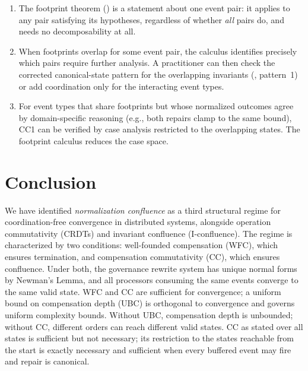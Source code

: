 \documentclass[11pt,a4paper]{article}
\theoremstyle{plain}
\theoremstyle{definition}
\theoremstyle{remark}
\renewcommand{\_}{\textunderscore\allowbreak}
\begin{document}
\begin{enumerate}[leftmargin=*,nosep]
\item The footprint theorem () is a statement about
  one event pair: it applies to any pair satisfying its hypotheses,
  regardless of whether \emph{all} pairs do, and 
  needs no decomposability at all.
\item When footprints overlap for some event pair, the calculus identifies
  precisely which pairs require further analysis.  A practitioner can then
  check the corrected canonical-state pattern for the overlapping invariants
  (, pattern~1) or add
  coordination only for the interacting event types.
\item For event types that share footprints but whose normalized outcomes
  agree by domain-specific reasoning (e.g., both repairs clamp to the same
  bound), CC1 can be verified by case analysis restricted to the overlapping
  states.  The footprint calculus reduces the case space.
\end{enumerate}

\section{Conclusion}
\label{sec:conclusion}

We have identified \emph{normalization confluence} as a third structural regime
for coordination-free convergence in distributed systems, alongside operation
commutativity (CRDTs) and invariant confluence (I-confluence).  The regime is
characterized by two conditions: well-founded compensation (WFC), which
ensures termination, and compensation commutativity (CC), which ensures
confluence.  Under both, the governance rewrite system has unique normal forms
by Newman's Lemma, and all processors consuming the same events converge to
the same valid state.  WFC and CC are sufficient for convergence; a uniform
bound on compensation depth (UBC) is orthogonal to convergence and governs
uniform complexity bounds.  Without UBC, compensation depth is unbounded;
without CC, different orders can reach different valid states.  CC as stated
over all states is sufficient but not necessary; its restriction to the states
reachable from the start is exactly necessary and sufficient when every
buffered event may fire and repair is canonical.
\end{document}
